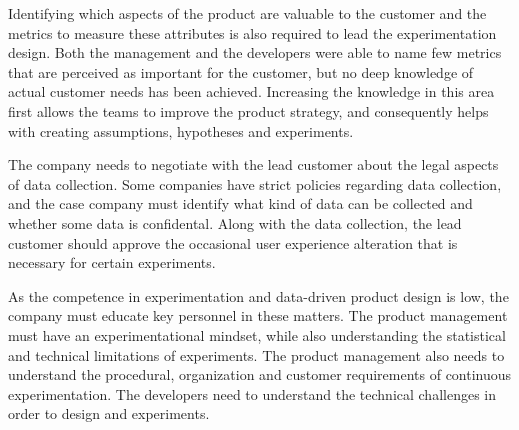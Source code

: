\documentclass[english]{tktltiki2}
\theoremstyle{definition}
\theoremstyle{remark}
\begin{document}
Identifying which aspects of the product are valuable to the customer and the metrics to measure these attributes is also required to lead the experimentation design. Both the management and the developers were able to name few metrics that are perceived as important for the customer, but no deep knowledge of actual customer needs has been achieved. Increasing the knowledge in this area first allows the teams to improve the product strategy, and consequently helps with creating assumptions, hypotheses and experiments. 

The company needs to negotiate with the lead customer about the legal aspects of data collection. Some companies have strict policies regarding data collection, and the case company must identify what kind of data can be collected and whether some data is confidental. Along with the data collection, the lead customer should approve the occasional user experience alteration that is necessary for certain experiments. 

As the competence in experimentation and data-driven product design is low, the company must educate key personnel in these matters. The product management must have an experimentational mindset, while also understanding the statistical and technical limitations of experiments. The product management also needs to understand the procedural, organization and customer requirements of continuous experimentation. The developers need to understand the technical challenges in order to design and experiments.




\end{document}
